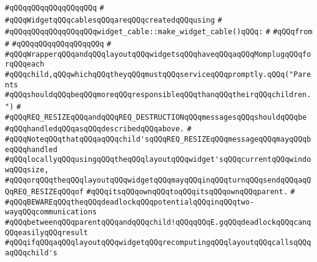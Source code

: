 \verb|#qQQqqQQqqQQqqQQqqQQq|\newline
\verb|#|\newline
\verb|#qQQqWidgetqQQqcablesqQQqareqQQqcreatedqQQqusing|\newline
\verb|#|\newline
\verb|#qQQqqQQqqQQqqQQqqQQqwidget_cable::make_widget_cable()qQQq:|\newline
\verb|#|\newline
\verb|#qQQqfrom|\newline
\verb|#|\newline
\verb|#qQQqqQQqqQQqqQQqqQQq|\newline
\verb|#|\newline
\verb|#qQQqWrapperqQQqandqQQqlayoutqQQqwidgetsqQQqhaveqQQqaqQQqMomplugqQQqforqQQqeach|\newline
\verb|#qQQqchild,qQQqwhichqQQqtheyqQQqmustqQQqserviceqQQqpromptly.qQQq("Parents|\newline
\verb|#qQQqshouldqQQqbeqQQqmoreqQQqresponsibleqQQqthanqQQqtheirqQQqchildren.")|\newline
\verb|#|\newline
\verb|#qQQqREQ_RESIZEqQQqandqQQqREQ_DESTRUCTIONqQQqmessagesqQQqshouldqQQqbe|\newline
\verb|#qQQqhandledqQQqasqQQqdescribedqQQqabove.|\newline
\verb|#|\newline
\verb|#qQQqNoteqQQqthatqQQqaqQQqchild'sqQQqREQ_RESIZEqQQqmessageqQQqmayqQQqbeqQQqhandled|\newline
\verb|#qQQqlocallyqQQqusingqQQqtheqQQqlayoutqQQqwidget'sqQQqcurrentqQQqwindowqQQqsize,|\newline
\verb|#qQQqorqQQqtheqQQqlayoutqQQqwidgetqQQqmayqQQqinqQQqturnqQQqsendqQQqaqQQqREQ_RESIZEqQQqof|\newline
\verb|#qQQqitsqQQqownqQQqtoqQQqitsqQQqownqQQqparent.|\newline
\verb|#|\newline
\verb|#qQQqBEWAREqQQqtheqQQqdeadlockqQQqpotentialqQQqinqQQqtwo-wayqQQqcommunications|\newline
\verb|#qQQqbetweenqQQqparentqQQqandqQQqchild!qQQqqQQqE.gqQQqdeadlockqQQqcanqQQqeasilyqQQqresult|\newline
\verb|#qQQqifqQQqaqQQqlayoutqQQqwidgetqQQqrecomputingqQQqlayoutqQQqcallsqQQqaqQQqchild's|\newline
